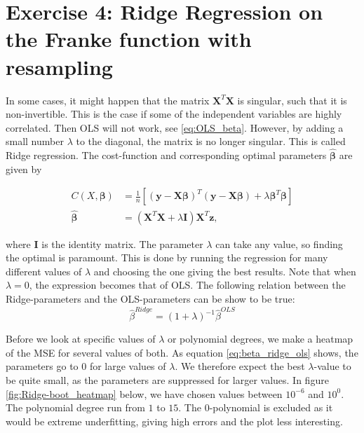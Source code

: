 \documentclass[reprint,english,notitlepage,aps,nobalancelastpage,nofootinbib]{revtex4-1}  %
\newcommand{\vc}[1]{\mathbf{#1}}
\begin{document}
\section*{Exercise 4: Ridge Regression on the Franke function with resampling}
In some cases, it might happen that the matrix $\mathbf{X}^T\mathbf{X}$ is singular, such that it is non-invertible. This is the case if some of the independent variables are highly correlated. Then OLS will not work, see \eqref{eq:OLS_beta}. However, by adding a small number $\lambda$ to the diagonal, the matrix is no longer singular. This is called Ridge regression. The cost-function and corresponding optimal parameters $\boldsymbol{\hat\beta}$ are given by

\begin{align*}
	C(X,\boldsymbol\beta) &= \frac{1}{n} \left[ \left(\mathbf{y}-\mathbf{X}\boldsymbol\beta\right)^T \left(\mathbf{y}-\mathbf{X}\boldsymbol\beta\right) + \lambda\boldsymbol\beta^T\boldsymbol\beta \right]
	\\
	\boldsymbol{\hat{\beta}} &= (\mathbf{X}^T\mathbf{X}+\lambda \mathbf{I})\mathbf{X}^T\vc{z},
\end{align*}

where $\mathbf{I}$ is  the identity matrix. The parameter $\lambda$ can take any value, so finding the optimal is paramount. This is done by running the regression for many different values of $\lambda$ and choosing the one giving the best results.  Note that when $\lambda=0$, the expression becomes that of OLS. The following relation between the Ridge-parameters and the OLS-parameters can be show to be true:
\begin{equation}\label{eq:beta_ridge_ols}
	\hat{\beta}^{Ridge} = (1 + \lambda)^{-1}\hat{\beta}^{OLS}
\end{equation}

Before we look at specific values of $\lambda$ or polynomial degrees, we make a heatmap of the MSE for several values of both. As equation \eqref{eq:beta_ridge_ols} shows, the parameters go to $0$ for large values of $\lambda$. We therefore expect the best $\lambda$-value to be quite small, as the parameters are suppressed for larger values. In figure \ref{fig:Ridge-boot_heatmap} below, we have chosen values between $10^{-6}$ and $10^0$. The polynomial degree run from $1$ to $15$. The 0-polynomial is excluded as it would be extreme underfitting, giving high errors and the plot less interesting.
\end{document}
